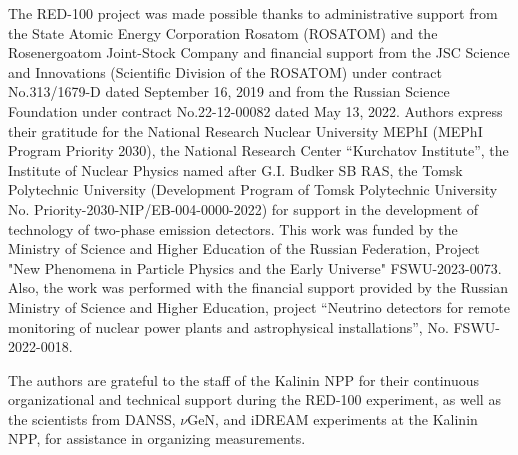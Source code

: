 \documentclass[a4paper,11pt]{article}
\begin{document}
\acknowledgments
The RED-100 project was made possible thanks to administrative support from the State Atomic Energy Corporation Rosatom (ROSATOM) and the Rosenergoatom Joint-Stock Company and financial support from the JSC Science and Innovations (Scientific Division of the ROSATOM) under contract No.313/1679-D dated September 16, 2019 and from the Russian Science Foundation under contract No.22-12-00082 dated May 13, 2022. Authors express their gratitude for the National Research Nuclear University MEPhI (MEPhI Program Priority 2030), the National Research Center “Kurchatov Institute”, the Institute of Nuclear Physics named after G.I. Budker SB RAS, the Tomsk Polytechnic University (Development Program of Tomsk Polytechnic University No. Priority-2030-NIP/EB-004-0000-2022) for support in the development of technology of two-phase emission detectors. This work was funded by the Ministry of Science and Higher Education of the Russian Federation, Project "New Phenomena in Particle Physics and the Early Universe" FSWU-2023-0073. Also, the work was performed with the financial support provided by the Russian Ministry of Science and Higher Education, project “Neutrino detectors for remote monitoring of nuclear power plants and astrophysical installations”, No. FSWU-2022-0018. 

The authors are grateful to the staff of the Kalinin NPP for their continuous organizational and technical support during the RED-100 experiment, as well as the scientists from DANSS, $\nu$GeN, and iDREAM experiments at the Kalinin NPP, for assistance in organizing measurements.











\end{document}
